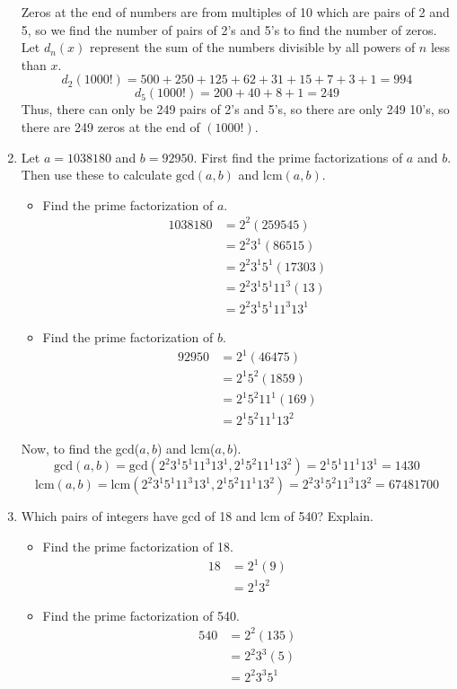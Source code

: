 \documentclass[class=article, crop=false]{standalone}
\begin{document}
\begin{enumerate}
  Zeros at the end of numbers are from multiples of 10 which are pairs of 2 and 5, so
  we find the number of pairs of 2's and 5's to find the number of zeros. Let $d_n(x)$
  represent the sum of the numbers divisible by all powers of $n$ less than $x$. 
  $$d_2(1000!) = 500 + 250 + 125 + 62 + 31 + 15 + 7 + 3 + 1 = 994$$
  $$d_5(1000!) = 200 + 40 + 8 + 1 = 249$$
  Thus, there can only be 249 pairs of 2's and 5's, so there are only 249 
  10's, so there are 249 zeros at the end of $(1000!)$.

\item
  Let $a=1038180$ and $b=92950$.
  First find the prime factorizations of $a$ and $b$.
  Then use these to calculate $\mbox{gcd}(a,b)$ and $\mbox{lcm}(a,b)$.

  \begin{itemize}
	\item[] Find the prime factorization of $a$.
		\begin{align*}
		  1038180 &= 2^2 (259545) \\
		  &= 2^2 3^1 (86515) \\
		  &= 2^2 3^1 5^1 (17303) \\
		  &= 2^2 3^1 5^1 11^3 (13) \\
		  &= 2^2 3^1 5^1 11^3 13^1
		\end{align*} 
	\item[] Find the prime factorization of $b$. 
		\begin{align*}
		  92950 &= 2^1 (46475) \\
		  &= 2^1 5^2 (1859) \\
		  &= 2^1 5^2 11^1 (169) \\
		  &= 2^1 5^2 11^1 13^2
		\end{align*}
  \end{itemize}
  Now, to find the gcd($a,b$) and lcm($a,b$).
  $$\text{gcd}(a,b) = \text{gcd}(2^2 3^1 5^1 11^3 13^1, 2^1 5^2 11^1 13^2) = 2^1 5^1 11^1 13^1 = 1430$$
  $$\text{lcm}(a,b) = \text{lcm}(2^2 3^1 5^1 11^3 13^1, 2^1 5^2 11^1 13^2) = 2^2 3^1 5^2 11^3 13^2 = 67481700$$

\item
  Which pairs of integers have gcd of 18 and lcm of 540?  Explain.

  \begin{itemize}
	\item[] Find the prime factorization of 18.
		\begin{align*}
		  18 &= 2^1 (9) \\
		  &= 2^1 3^2
		\end{align*} 
	\item[] Find the prime factorization of 540. 
		\begin{align*}
		  540 &= 2^2 (135) \\
		  &= 2^2 3^3 (5) \\
		  &= 2^2 3^3 5^1
		\end{align*}
  \end{itemize}
  

\end{enumerate}
\end{document}
